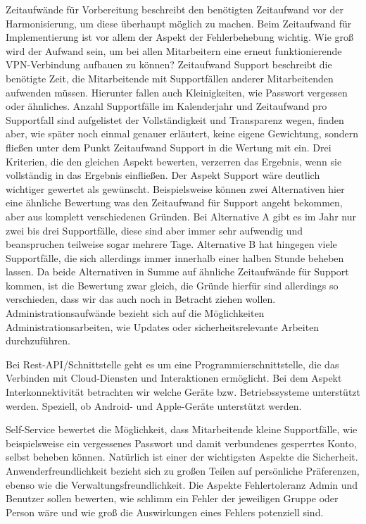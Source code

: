 Zeitaufwände für Vorbereitung beschreibt den benötigten Zeitaufwand vor der Harmonisierung, um diese überhaupt möglich zu machen. Beim Zeitaufwand für Implementierung ist vor allem der Aspekt der Fehlerbehebung wichtig. Wie groß wird der Aufwand sein, um bei allen Mitarbeitern eine erneut funktionierende VPN-Verbindung aufbauen zu können? Zeitaufwand Support beschreibt die benötigte Zeit, die Mitarbeitende mit Supportfällen anderer Mitarbeitenden aufwenden müssen. Hierunter fallen auch Kleinigkeiten, wie Passwort vergessen oder ähnliches. Anzahl Supportfälle im Kalenderjahr und Zeitaufwand pro Supportfall sind aufgelistet der Vollständigkeit und Transparenz wegen, finden aber, wie später noch einmal genauer erläutert, keine eigene Gewichtung, sondern fließen unter dem Punkt Zeitaufwand Support in die Wertung mit ein. Drei Kriterien, die den gleichen Aspekt bewerten, verzerren das Ergebnis, wenn sie vollständig in das Ergebnis einfließen. Der Aspekt Support wäre deutlich wichtiger gewertet als gewünscht. Beispielsweise können zwei Alternativen hier eine ähnliche Bewertung was den Zeitaufwand für Support angeht bekommen, aber aus komplett verschiedenen Gründen. Bei Alternative A gibt es im Jahr nur zwei bis drei Supportfälle, diese sind aber immer sehr aufwendig und beanspruchen teilweise sogar mehrere Tage. Alternative B hat hingegen viele Supportfälle, die sich allerdings immer innerhalb einer halben Stunde beheben lassen. Da beide Alternativen in Summe auf ähnliche Zeitaufwände für Support kommen, ist die Bewertung zwar gleich, die Gründe hierfür sind allerdings so verschieden, dass wir das auch noch in Betracht ziehen wollen. Administrationsaufwände bezieht sich auf die Möglichkeiten Administrationsarbeiten, wie Updates oder sicherheitsrelevante Arbeiten durchzuführen.

Bei Rest-API/Schnittstelle geht es um eine Programmierschnittstelle, die das Verbinden mit Cloud-Diensten und Interaktionen ermöglicht. Bei dem Aspekt Interkonnektivität betrachten wir welche Geräte bzw. Betriebssysteme unterstützt werden. Speziell, ob Android- und Apple-Geräte unterstützt werden.

Self-Service bewertet die Möglichkeit, dass Mitarbeitende kleine Supportfälle, wie beispielsweise ein vergessenes Passwort und damit verbundenes gesperrtes Konto, selbst beheben können. Natürlich ist einer der wichtigsten Aspekte die Sicherheit. Anwenderfreundlichkeit bezieht sich zu großen Teilen auf persönliche Präferenzen, ebenso wie die Verwaltungsfreundlichkeit. Die Aspekte Fehlertoleranz Admin und Benutzer sollen bewerten, wie schlimm ein Fehler der jeweiligen Gruppe oder Person wäre und wie groß die Auswirkungen eines Fehlers potenziell sind.

